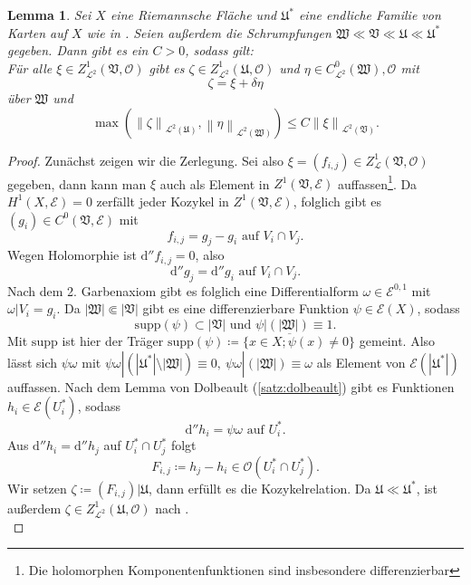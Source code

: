 \documentclass[11pt,a4paper,toc=bibliography]{scrartcl}
\theoremstyle{thm}
\newtheorem{lemma}{Lemma}[section]
\theoremstyle{def}
\theoremstyle{remark}
\newcommand*{\norm}[1]{\left\lVert#1\right\rVert} %
\begin{document}
\begin{lemma}
Sei $X$ eine Riemannsche Fläche und $\mathfrak{U}^*$ eine endliche Familie von Karten auf $X$ wie in . 
Seien außerdem die Schrumpfungen $\mathfrak{W}\ll\mathfrak{V}\ll\mathfrak{U}\ll\mathfrak{U}^*$ gegeben.
Dann gibt es ein $C>0$, sodass gilt:\\
Für alle $\xi\in Z^1_{\mathcal{L}^2}(\mathfrak{V},\mathcal{O})$ gibt es $\zeta\in Z^1_{\mathcal{L}^2}(\mathfrak{U},\mathcal{O})$ und $\eta\in C^0_{\mathcal{L}^2}(\mathfrak{W}),\mathcal{O}$ mit
\[
\zeta = \xi+\delta\eta
\]
über $\mathfrak{W}$ und
\[
\max\left( \norm{\zeta}_{\mathcal{L}^2(\mathfrak{U})},\norm{\eta}_{\mathcal{L}^2(\mathfrak{W})}\right)\leq C\norm{\xi}_{\mathcal{L}^2(\mathfrak{V})}.
\]
\end{lemma}
\begin{proof}
Zunächst zeigen wir die Zerlegung. Sei also $\xi=(f_{i,j})\in Z^1_{\mathcal{L}}(\mathfrak{V},\mathcal{O})$ gegeben, dann kann man $\xi $ auch als Element in $Z^1(\mathfrak{V},\mathcal{E})$ auffassen\footnote{
Die holomorphen Komponentenfunktionen sind insbesondere differenzierbar
}.
Da $H^1(X,\mathcal{E})=0$ \cite[~S.92,12.6]{forster} zerfällt jeder Kozykel in $Z^1(\mathfrak{V},\mathcal{E})$, folglich gibt es $(g_i)\in C^0(\mathfrak{V},\mathcal{E})$ mit
\[
f_{i,j}=g_j-g_i\text{ auf } V_i\cap V_j.
\]
Wegen Holomorphie ist $\mathrm{d}''f_{i,j}=0$, also 
\[
\mathrm{d}''g_j = \mathrm{d}''g_i\text{ auf } V_i\cap V_j.
\]
Nach dem 2. Garbenaxiom gibt es folglich eine Differentialform $\omega\in\mathcal{E}^{0,1}$ mit $\omega|V_i=g_i$. Da $|\mathfrak{W}|\Subset|\mathfrak{V}|$ gibt es eine differenzierbare Funktion $\psi\in\mathcal{E}(X)$, sodass
\[
\mathrm{supp}(\psi)\subset|\mathfrak{V}|\text{ und } \psi|(|\mathfrak{W}|)\equiv 1. 
\]
Mit $\mathrm{supp}$ ist hier der Träger $\mathrm{supp}(\psi)\overline{\coloneqq \{x\in X; \psi(x)\neq 0\}}$ gemeint.
Also lässt sich $\psi\omega$ mit $\psi\omega|(|\mathfrak{U}^*|\setminus|\mathfrak{W}|)\equiv 0,~\psi\omega|(|\mathfrak{W}|)\equiv \omega$ als Element von $\mathcal{E}(|\mathfrak{U}^*|)$ auffassen. Nach dem Lemma von Dolbeault (\ref{satz:dolbeault}) gibt es Funktionen $h_i\in\mathcal{E}(U_i^*)$, sodass
\[
\mathrm{d}''h_i=\psi\omega\text{ auf } U_i^*.
\]
Aus $\mathrm{d}''h_i=\mathrm{d}''h_j$ auf $U_i^* \cap U_j^*$ folgt
\[
F_{i,j}\coloneqq h_j-h_i\in\mathcal{O}(U_i^*\cap U_j^*).
\]
Wir setzen $\zeta\coloneqq (F_{i,j})|\mathfrak{U}$, dann erfüllt es die Kozykelrelation. Da $\mathfrak{U}\ll\mathfrak{U}^*$, ist außerdem $\zeta\in Z^1_{\mathcal{L}^2}(\mathfrak{U},\mathcal{O})$ nach .\\

\end{proof}
\end{document}
